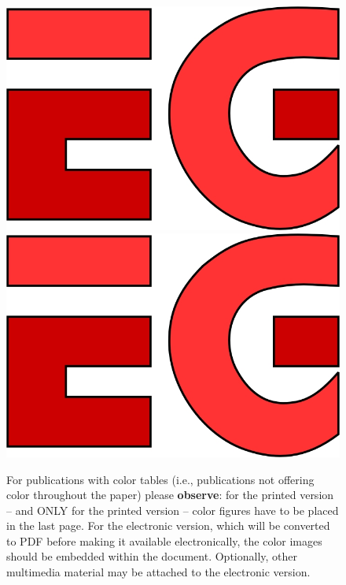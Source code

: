 \documentclass{egpubl}
\begin{document}
%




\newpage


\begin{figure}[tbp]
  \centering
  \mbox{} \hfill
  \includegraphics[width=.3\linewidth]{sampleFig}
  \hfill
  \includegraphics[width=.3\linewidth]{sampleFig}
  \hfill \mbox{}
  \caption{\label{fig:ex3}%
           For publications with color tables (i.e., publications not offering
           color throughout the paper) please \textbf{observe}: 
           for the printed version -- and ONLY for the printed
           version -- color figures have to be placed in the last page.
           \newline
           For the electronic version, which will be converted to PDF before
           making it available electronically, the color images should be
           embedded within the document. Optionally, other multimedia
           material may be attached to the electronic version. }
\end{figure}
\end{document}
